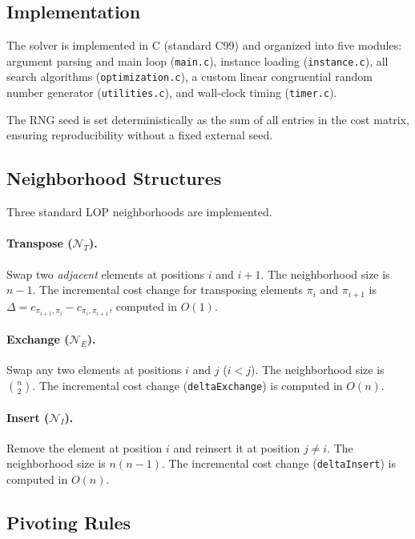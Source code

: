 \documentclass[11pt,a4paper]{article}
\begin{document}
\subsection{Implementation}

The solver is implemented in C (standard C99) and organized into five
modules: argument parsing and main loop (\texttt{main.c}), instance
loading (\texttt{instance.c}), all search algorithms
(\texttt{optimization.c}), a custom linear congruential random number
generator (\texttt{utilities.c}), and wall-clock timing
(\texttt{timer.c}).

The RNG seed is set deterministically as the sum of all entries in the
cost matrix, ensuring reproducibility without a fixed external seed.

\subsection{Neighborhood Structures}

Three standard LOP neighborhoods are implemented.

\paragraph{Transpose ($\mathcal{N}_T$).}
Swap two \emph{adjacent} elements at positions $i$ and $i+1$.  The
neighborhood size is $n-1$.  The incremental cost change for transposing
elements $\pi_i$ and $\pi_{i+1}$ is
$\Delta = c_{\pi_{i+1},\pi_i} - c_{\pi_i,\pi_{i+1}}$,
computed in $O(1)$.

\paragraph{Exchange ($\mathcal{N}_E$).}
Swap any two elements at positions $i$ and $j$ ($i < j$).  The
neighborhood size is $\binom{n}{2}$.  The incremental cost change
(\texttt{deltaExchange}) is computed in $O(n)$.

\paragraph{Insert ($\mathcal{N}_I$).}
Remove the element at position $i$ and reinsert it at position $j
\neq i$.  The neighborhood size is $n(n-1)$.  The incremental cost
change (\texttt{deltaInsert}) is computed in $O(n)$.

\subsection{Pivoting Rules}
\end{document}

